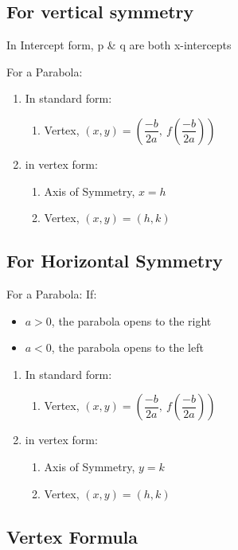 \documentclass[openany]{book}
\begin{document}
\subsection{For vertical symmetry}

In Intercept form, p \& q are both x-intercepts

For a Parabola:
\begin{enumerate}
	\item In standard form:
	      \begin{enumerate}
		      \item Vertex, \((x,y)=(\dfrac{-b}{2a},\ f(\dfrac{-b}{2a}))\)
	      \end{enumerate}
	\item in vertex form:
	      \begin{enumerate}
		      \item Axis of Symmetry, \(x=h\)
		      \item Vertex, \((x,y)=(h, k)\)
	      \end{enumerate}
\end{enumerate}

\subsection{For Horizontal Symmetry}

For a Parabola:
If:
\begin{itemize}
	\item \(a>0\), the parabola opens to the right
	\item \(a<0\), the parabola opens to the left
\end{itemize}
\begin{enumerate}
	\item In standard form:
	      \begin{enumerate} 
		      \item Vertex, \((x,y)=(\dfrac{-b}{2a},\ f(\dfrac{-b}{2a}))\)
	      \end{enumerate}
	\item in vertex form:
	      \begin{enumerate}
		      \item Axis of Symmetry, \(y=k\)
		      \item Vertex, \((x,y)=(h, k)\)
	      \end{enumerate}
\end{enumerate}

\subsection{Vertex Formula}
\end{document}
